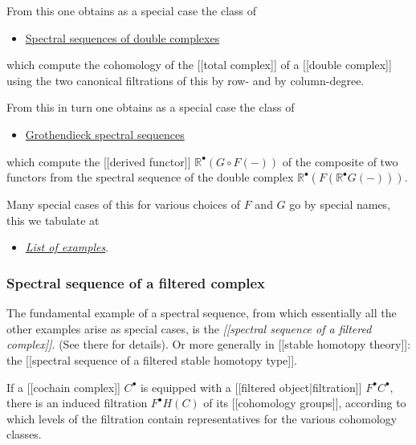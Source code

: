 \documentclass[12pt,titlepage]{article}
\theoremstyle{plain}
\theoremstyle{definition}
\theoremstyle{remark}
\begin{document}
From this one obtains as a special case the class of

\begin{itemize}%
\item \hyperlink{SpectralSequenceOfADoubleComplex}{Spectral sequences of double complexes}

\end{itemize}
which compute the cohomology of the [[total complex]] of a [[double complex]] using the two canonical filtrations of this by row- and by column-degree.

From this in turn one obtains as a special case the class of

\begin{itemize}%
\item \hyperlink{GrothendieckSpectralSequence}{Grothendieck spectral sequences}

\end{itemize}
which compute the [[derived functor]] $\mathbb{R}^\bullet(G \circ F (-))$ of the composite of two functors from the spectral sequence of the double complex $\mathbb{R}^\bullet (F (\mathbb{R}^\bullet G (-)))$.

Many special cases of this for various choices of $F$ and $G$ go by special names, this we tabulate at

\begin{itemize}%
\item \emph{\hyperlink{ListOfExamples}{List of examples}}.

\end{itemize}
\hypertarget{SpectralSequenceOfFilteredComplex}{}\subsubsection*{{Spectral sequence of a filtered complex}}\label{SpectralSequenceOfFilteredComplex}

The fundamental example of a spectral sequence, from which essentially all the other examples arise as special cases, is the \emph{[[spectral sequence of a filtered complex]]}. (See there for details). Or more generally in [[stable homotopy theory]]: the [[spectral sequence of a filtered stable homotopy type]].

If a [[cochain complex]] $C^\bullet$ is equipped with a [[filtered object|filtration]] $F^\bullet C^\bullet$, there is an induced filtration $F^\bullet H(C)$ of its [[cohomology groups]], according to which levels of the filtration contain representatives for the various cohomology classes.
\end{document}
